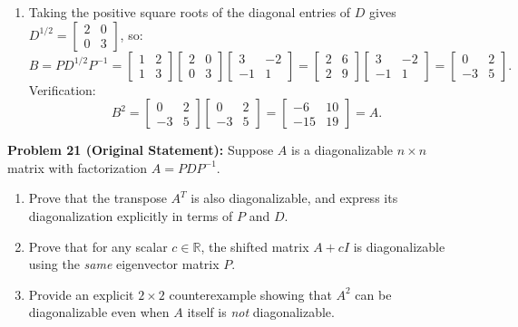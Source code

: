 \documentclass[11pt, letterpaper]{article}
\theoremstyle{definition}
\theoremstyle{remark}
\begin{document}
\begin{enumerate}[label=(\alph*)]
    \item Taking the positive square roots of the diagonal entries of $D$ gives $D^{1/2} = \begin{bmatrix} 2 & 0 \\ 0 & 3 \end{bmatrix}$, so:
    \[
    B = PD^{1/2}P^{-1} = \begin{bmatrix} 1 & 2 \\ 1 & 3 \end{bmatrix}\begin{bmatrix} 2 & 0 \\ 0 & 3 \end{bmatrix}\begin{bmatrix} 3 & -2 \\ -1 & 1 \end{bmatrix} = \begin{bmatrix} 2 & 6 \\ 2 & 9 \end{bmatrix}\begin{bmatrix} 3 & -2 \\ -1 & 1 \end{bmatrix} = \begin{bmatrix} 0 & 2 \\ -3 & 5 \end{bmatrix}.
    \]
    Verification:
    \[
    B^{2} = \begin{bmatrix} 0 & 2 \\ -3 & 5 \end{bmatrix}\begin{bmatrix} 0 & 2 \\ -3 & 5 \end{bmatrix} = \begin{bmatrix} -6 & 10 \\ -15 & 19 \end{bmatrix} = A.
    \]
\end{enumerate}

\vspace{0.8em}
\textbf{Problem 21 (Original Statement):}
Suppose $A$ is a diagonalizable $n \times n$ matrix with factorization $A = PDP^{-1}$.
\begin{enumerate}[label=(\alph*)]
    \item Prove that the transpose $A^{T}$ is also diagonalizable, and express its diagonalization explicitly in terms of $P$ and $D$.
    \item Prove that for any scalar $c \in \mathbb{R}$, the shifted matrix $A + cI$ is diagonalizable using the \emph{same} eigenvector matrix $P$.
    \item Provide an explicit $2 \times 2$ counterexample showing that $A^{2}$ can be diagonalizable even when $A$ itself is \emph{not} diagonalizable.
\end{enumerate}
\end{document}
